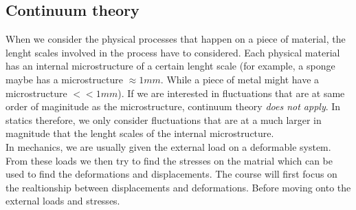 \subsection{Continuum theory}
When we consider the physical processes that happen on a piece of material, the lenght scales involved in the process have to considered. Each physical material has an internal microstructure of a certain lenght scale (for example, a sponge maybe has a microstructure $\approx 1mm$. While a piece of metal might have a microstructure $<< 1mm$). If we are interested in fluctuations that are at same order of maginitude as the microstructure, continuum theory \emph{does not apply}. In statics therefore, we only consider fluctuations that are at a much larger in magnitude that the lenght scales of the internal microstructure.\\
\newline
In mechanics, we are usually given the external load on a deformable system. From these loads we then try to find the stresses on the matrial which can be used to find the deformations and displacements. The course will first focus on the realtionship between displacements and deformations. Before moving onto the external loads and stresses. 
